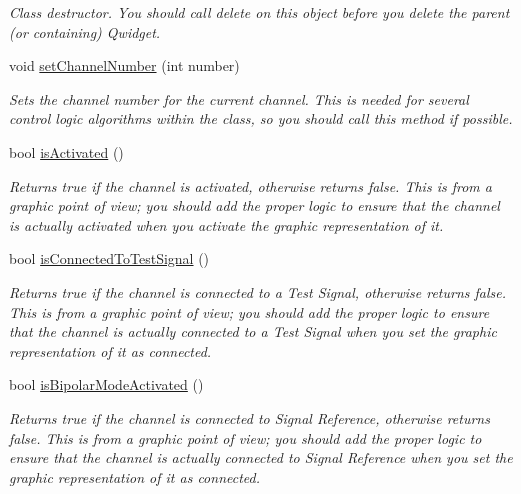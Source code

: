 \begin{DoxyCompactItemize}
\begin{DoxyCompactList}\small\item\em Class destructor. You should call delete on this object before you delete the parent (or containing) Qwidget. \end{DoxyCompactList}\item 
void \hyperlink{classChannelLayout_a8af1129c9668ad666f3f8b5884bc2e26}{set\+Channel\+Number} (int number)
\begin{DoxyCompactList}\small\item\em Sets the channel number for the current channel. This is needed for several control logic algorithms within the class, so you should call this method if possible. \end{DoxyCompactList}\item 
bool \hyperlink{classChannelLayout_a5da445dac029cce162e4ef9854b513e6}{is\+Activated} ()
\begin{DoxyCompactList}\small\item\em Returns true if the channel is activated, otherwise returns false. This is from a graphic point of view; you should add the proper logic to ensure that the channel is actually activated when you activate the graphic representation of it. \end{DoxyCompactList}\item 
bool \hyperlink{classChannelLayout_ad4b21ae7682d344ac142241a79778142}{is\+Connected\+To\+Test\+Signal} ()
\begin{DoxyCompactList}\small\item\em Returns true if the channel is connected to a Test Signal, otherwise returns false. This is from a graphic point of view; you should add the proper logic to ensure that the channel is actually connected to a Test Signal when you set the graphic representation of it as connected. \end{DoxyCompactList}\item 
bool \hyperlink{classChannelLayout_a9eb37631caab95945c6b7443740a396f}{is\+Bipolar\+Mode\+Activated} ()
\begin{DoxyCompactList}\small\item\em Returns true if the channel is connected to Signal Reference, otherwise returns false. This is from a graphic point of view; you should add the proper logic to ensure that the channel is actually connected to Signal Reference when you set the graphic representation of it as connected. \end{DoxyCompactList}\item 

\end{DoxyCompactItemize}
